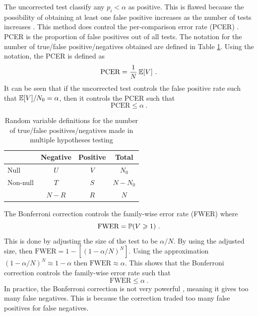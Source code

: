The uncorrected test classify any $p_i<\alpha$ as positive. This is flawed because the possibility of obtaining at least one false positive increases as the number of tests increases \citep{shaffer1995multiple}. This method does control the per-comparison error rate (PCER) \citep{benjamini1995controlling}. PCER is the proportion of false positives out of all tests. The notation for the number of true/false positive/negatives obtained are defined in Table \ref{table:inference_randomvariables}. Using the notation, the PCER is defined as
\begin{equation}
  \text{PCER}=
  \dfrac{1}{N}
  \operatorname{\mathbb{E}}[V]
  \ .
\end{equation}
It can be seen that if the uncorrected test controls the false positive rate such that $\operatorname{\mathbb{E}}[V]/N_0 = \alpha$, then it controls the PCER such that
\begin{equation}
  \text{PCER}\leqslant\alpha \ .
\end{equation}

\begin{table}
  \centering
  \begin{tabular}{l|cc|c}
    &Negative&Positive&Total\\\hline
    Null & $U$ & $V$ & $N_0$\\
    Non-null & $T$ & $S$ & $N-N_0$\\\hline
    &$N-R$&$R$&$N$
  \end{tabular}
  \caption{Random variable definitions for the number of true/false positives/negatives made in multiple hypotheses testing}
  \label{table:inference_randomvariables}
\end{table} 

The Bonferroni correction \citep{shaffer1995multiple, bland1995multiple, perneger1998what} controls the family-wise error rate (FWER) \citep{shaffer1995multiple} where
\begin{equation}
  \text{FWER} = \operatorname{\mathbb{P}}(V\geqslant1) \ .
  \label{eq:inference_fwer}
\end{equation}
This is done by adjusting the size of the test to be $\alpha/N$. By using the adjusted size, then $\text{FWER}=1-\left[(1-\alpha/N)^N\right]$. Using the approximation $(1-\alpha/N)^N\approx 1-\alpha$ then $\text{FWER}\approx \alpha$. This shows that the Bonferroni correction controls the family-wise error rate such that
\begin{equation}
  \text{FWER} \leqslant \alpha \ .
\end{equation}
In practice, the Bonferroni correction is not very powerful \citep{perneger1998what}, meaning it gives too many false negatives. This is because the correction traded too many false positives for false negatives.

